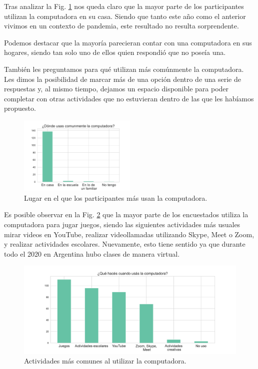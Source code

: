 Tras analizar la Fig. \ref{fig:analisis3} nos queda claro que la mayor parte de los participantes utilizan la computadora en su casa. Siendo que tanto este año como el anterior vivimos en un contexto de pandemia, este resultado no resulta sorprendente.

Podemos destacar que la mayoría parecieran contar con una computadora en sus hogares, siendo tan solo uno de ellos quien respondió que no poseía una.

También les preguntamos para qué utilizan más comúnmente la computadora. Les dimos la posibilidad de marcar más de una opción dentro de una serie de respuestas y, al mismo tiempo, dejamos un espacio disponible para poder completar con otras actividades que no estuvieran dentro de las que les habíamos propuesto.

\begin{figure}[h]
    \centering
    \includegraphics[width=0.5\textwidth]{images_analisis/3.pdf}
    \caption{Lugar en el que los participantes más usan la computadora.}
    \label{fig:analisis3}
\end{figure}

Es posible observar en la Fig. \ref{fig:analisis4} que la mayor parte de los encuestados utiliza la computadora para jugar juegos, siendo las siguientes actividades más usuales mirar videos en YouTube, realizar videollamadas utilizando Skype, Meet o Zoom, y realizar actividades escolares. Nuevamente, esto tiene sentido ya que durante todo el 2020 en Argentina hubo clases de manera virtual.

\begin{figure}[h]
    \centering
    \includegraphics[width=1\textwidth]{images_analisis/4.pdf}
    \caption{Actividades más comunes al utilizar la computadora.}
    \label{fig:analisis4}
\end{figure}

